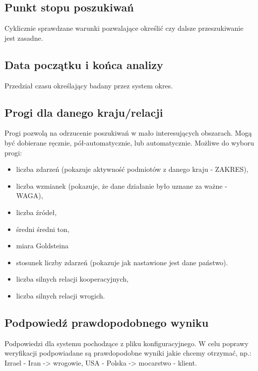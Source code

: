 \documentclass[11pt]{report}
\begin{document}
    \subsection{Punkt stopu poszukiwań}
    Cyklicznie sprawdzane warunki pozwalające określić czy dalsze przeszukiwanie jest zasadne.

    \subsection{Data początku i końca analizy}
    Przedział czasu określający badany przez system okres.

    \subsection{Progi dla danego kraju/relacji}\label{subsec:progi-dla-danego-kraju/relacji}
    Progi pozwolą na odrzucenie poszukiwań w mało interesujących obszarach.
    Mogą być dobierane ręcznie, pół-automatycznie, lub automatycznie.
    Możliwe do wyboru progi:
    \begin{itemize}
        \item liczba zdarzeń (pokazuje aktywność podmiotów z danego kraju - ZAKRES),
        \item liczba wzmianek (pokazuje, że dane działanie było uznane za ważne - WAGA),
        \item liczba źródeł,
        \item średni średni ton,
        \item miara Goldsteina
        \item stosunek liczby zdarzeń (pokazuje jak nastawione jest dane państwo).
        \item liczba silnych relacji kooperacyjnych,
        \item liczba silnych relacji wrogich.
    \end{itemize}

    \subsection{Podpowiedź prawdopodobnego wyniku}\label{subsec:podpowiedź-prawdopodobnego-wyniku}
    Podpowiedzi dla systemu pochodzące z pliku konfiguracyjnego.
    W celu poprawy weryfikacji podpowiadane są prawdopodobne wyniki jakie chcemy otrzymać,
    np.: Izrael - Iran -> wrogowie, USA - Polska -> mocarstwo - klient.
\end{document}
